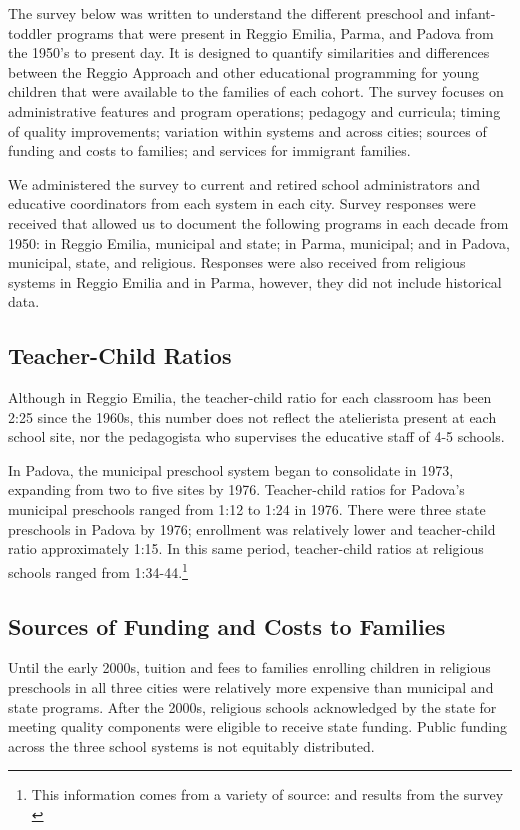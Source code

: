 The survey below was written to understand the different preschool and infant-toddler programs that were present in Reggio Emilia, Parma, and Padova from the 1950's to present day. It is designed to quantify similarities and differences between the Reggio Approach and other educational programming for young children that were available to the families of each cohort. The survey focuses on administrative features and program operations; pedagogy and curricula; timing of quality improvements; variation within systems and across cities; sources of funding and costs to families; and services for immigrant families.

We administered the survey to current and retired school administrators and educative coordinators from each system in each city. Survey responses were received that allowed us to document the following programs in each decade from 1950: in Reggio Emilia, municipal and state; in Parma, municipal; and in Padova, municipal, state, and religious. Responses were also received from religious systems in Reggio Emilia and in Parma, however, they did not include historical data.

\subsection{Teacher-Child Ratios}
Although in Reggio Emilia, the teacher-child ratio for each classroom has been 2:25 since the 1960s, this number does not reflect the atelierista present at each school site, nor the pedagogista who supervises the educative staff of 4-5 schools. 

In Padova, the municipal preschool system began to consolidate in 1973, expanding from two to five sites by 1976. Teacher-child ratios for Padova's municipal preschools ranged from 1:12 to 1:24 in 1976. There were three state preschools in Padova by 1976; enrollment was relatively lower and teacher-child ratio approximately 1:15. In this same period, teacher-child ratios at religious schools ranged from 1:34-44.\footnote{This information comes from a variety of source: \citet{Reggio-Admin-data_1966-2006, Reggio-Annual-Journals_1994-2011, Padova-Admin-Data_1964-2011} and results from the survey \citep{CEHD_2016_Historical-Analysis}} 
 
\subsection{Sources of Funding and Costs to Families }
Until the early 2000s, tuition and fees to families enrolling children in religious preschools in all three cities were relatively more expensive than municipal and state programs. After the 2000s, religious schools acknowledged by the state for meeting quality components were eligible to receive state funding. Public funding across the three school systems is not equitably distributed. 

